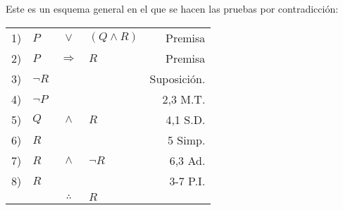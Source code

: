 \documentclass[12pt]{report}
\theoremstyle{largebreak}
\begin{document}
    \begin{exa}
        Este es un esquema general en el que se hacen las pruebas por contradicción:
        \begin{center}
            \begin{tabular}{l l c l r}
                1) & $P$ & $\lor$ & $(Q\land R)$ & Premisa \\
                2) & $P$ & $\Rightarrow$ & $R$ & Premisa \\
                3) & $\neg R$ &  &  & Suposición. \\
                4) & $\neg P$ &  &  & 2,3 M.T. \\
                5) & $Q$ & $\land$ & $R$ & 4,1 S.D. \\
                6) & $R$ &  &  & 5 Simp. \\
                7) & $R$ & $\land$ & $\neg R$ & 6,3 Ad. \\
                8) & $R$ &  &  & 3-7 P.I. \\

                \hline
                & & $\therefore$ & $R$ & \\
            \end{tabular}
        \end{center}
    \end{exa}
\end{document}
